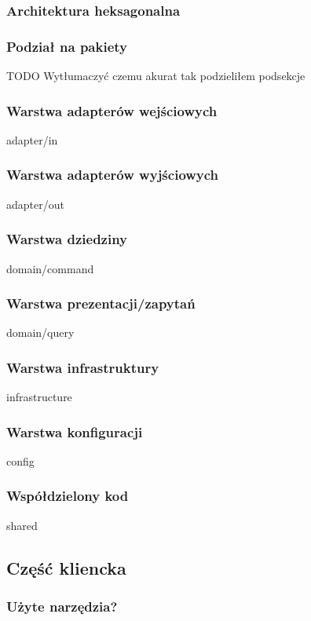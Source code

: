 \subsubsection{Architektura heksagonalna}

\subsubsection{Podział na pakiety}

TODO Wytłumaczyć czemu akurat tak podzieliłem podsekcje

\subsubsection{Warstwa adapterów wejściowych} adapter/in

\subsubsection{Warstwa adapterów wyjściowych} adapter/out

\subsubsection{Warstwa dziedziny} domain/command

\subsubsection{Warstwa prezentacji/zapytań} domain/query

\subsubsection{Warstwa infrastruktury} infrastructure

\subsubsection{Warstwa konfiguracji} config

\subsubsection{Współdzielony kod} shared

\subsection{Część kliencka}

\subsubsection{Użyte narzędzia?}

